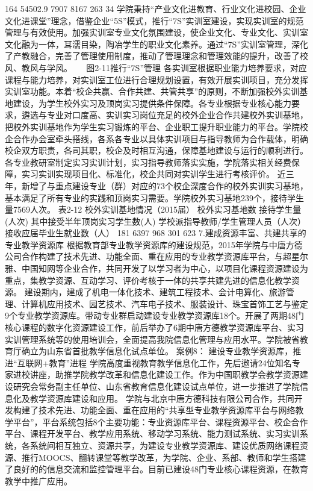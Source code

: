 164
54502.9
7907
8167
263
34
学院秉持“产业文化进教育、行业文化进校园、企业文化进课堂”理念，借鉴企业“5S”模式，推行“7S”实训室建设，实现实训室的规范管理与有效使用。加强实训室专业文化氛围建设，使企业文化、专业文化、实训室文化融为一体，耳濡目染，陶冶学生的职业文化素养。通过“7S”实训室管理，深化了产教融合，完善了管理使用制度，推动了管理理念和管理效能的提升，改善了校风、教风与学风。
　
图2-11推行“7S”管理
各实训室根据职业能力培养要求，对应课程与能力培养，对实训室工位进行合理规划设置，有效开展实训项目，充分发挥实训室功能。本着“校企共赢、合作共建、共管共享”的原则，不断加强校外实训基地建设，为学生校外实习及顶岗实习提供条件保障。各专业根据专业核心能力要求，遴选与专业对口度高、实训实习岗位充足的校外企业合作共建校外实训基地，把校外实训基地作为学生实习锻炼的平台、企业职工提升职业能力的平台。学院校企合作办会室牵头搭线，各系各专业以具体实训项目与指导教师为合作载体，明确校企双方职责，各司其职，校企及时相互沟通，保障基地建设与运行的顺利进行。各专业教研室制定实习实训计划，实习指导教师落实实施，学院落实相关经费保障，实习实训实现项目化、标准化，校企共同对实训学生进行考核评价。
近三年，新增了与重点建设专业（群）对应的73个校企深度合作的校外实训实习基地，基本满足了所有专业的实践和顶岗实习需要。学院校外实习基地239个，接待学生量7569人次。
表2-12 校外实训基地情况（2015届）
校外实习基地数
接待学生量(人次)
其中接受半年顶岗实习学生数(人)
学校派指导教师/学生管理人员（人次）
接收应届毕业生就业数（人）
181
6397
968
301
623
7.建成资源丰富、共建共享的专业教学资源库
根据教育部专业教学资源库的建设规范，2015年学院与中唐方德公司合作构建了技术先进、功能全面、重在应用的专业教学资源库平台，与超星尔雅、中国知网等企业合作，共同开发了以学习者为中心，以项目化课程资源建设为重点，集教学资源、互动学习、评价考核于一体的共享共建先进的信息化教学资源。
建设期内，建成了机电一体化技术、建筑工程技术、会计电算化、旅游管理、计算机应用技术、园艺技术、汽车电子技术、服装设计、珠宝首饰工艺与鉴定9个专业教学资源库。带动专业群启动建设专业教学资源库18个。开展了两期48门核心课程的数字化资源建设工作，前后举办了6期中唐方德教学资源库平台、实习实训管理系统等的使用培训会，全面提高我院信息化管理与应用水平。学院被省教育厅确立为山东省首批教学信息化试点单位。
案例8： 建设专业教学资源库，推进“互联网+教育”进程
学院高度重视教育教学信息化工作，先后邀请24位知名专家进校讲座，助推学院教学改革和信息化建设工作。作为中国职教学会教学资源建设研究会常务副主任单位、山东省教育信息化建设试点单位，进一步推进了学院信息化及教学资源库建设和应用。
学院与北京中唐方德科技有限公司合作，共同开发构建了技术先进、功能全面、重在应用的“共享型专业教学资源库平台与网络教学平台”，平台系统包括8个主要功能：专业资源库平台、课程资源平台、校企合作平台、课程开发平台、教学应用系统、移动学习系统、能力测试系统、实习实训系统，各系统间相互独立、资源共享，为建设专业教学资源库、建设优质网络课程资源、推行MOOCS、翻转课堂等教学改革，为学院、企业、系部、教师和学生搭建了良好的的信息交流和监控管理平台。目前已建设48门专业核心课程资源，在教育教学中推广应用。 

